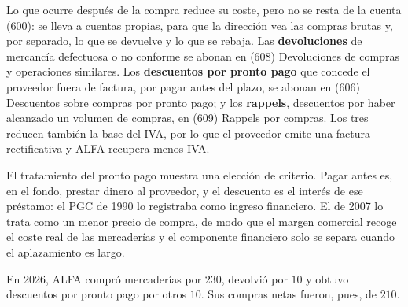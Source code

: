 \documentclass[10pt,a4paper]{article}
\begin{document}
Lo que ocurre después de la compra reduce su coste, pero no se resta de la cuenta (600): se lleva a cuentas propias, para que la dirección vea las compras brutas y, por separado, lo que se devuelve y lo que se rebaja. Las \textbf{devoluciones} de mercancía defectuosa o no conforme se abonan en (608) Devoluciones de compras y operaciones similares. Los \textbf{descuentos por pronto pago} que concede el proveedor fuera de factura, por pagar antes del plazo, se abonan en (606) Descuentos sobre compras por pronto pago; y los \textbf{rappels}, descuentos por haber alcanzado un volumen de compras, en (609) Rappels por compras. Los tres reducen también la base del IVA, por lo que el proveedor emite una factura rectificativa y ALFA recupera menos IVA.

El tratamiento del pronto pago muestra una elección de criterio. Pagar antes es, en el fondo, prestar dinero al proveedor, y el descuento es el interés de ese préstamo: el PGC de 1990 lo registraba como ingreso financiero. El de 2007 lo trata como un menor precio de compra, de modo que el margen comercial recoge el coste real de las mercaderías y el componente financiero solo se separa cuando el aplazamiento es largo.

En 2026, ALFA compró mercaderías por $230$, devolvió por $10$ y obtuvo descuentos por pronto pago por otros $10$. Sus compras netas fueron, pues, de $210$.
\end{document}
